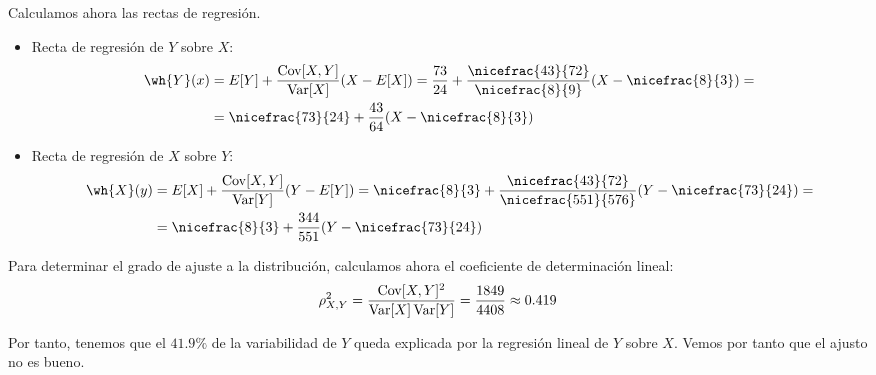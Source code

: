 \begin{ejercicio}
    Calculamos ahora las rectas de regresión.
    \begin{itemize}
        \item Recta de regresión de $Y$ sobre $X$:
        \begin{align*}
            \wh{Y}(x) &= E[Y] + \dfrac{\Cov[X,Y]}{\Var[X]}(X - E[X])
            = \frac{73}{24} + \dfrac{\nicefrac{43}{72}}{\nicefrac{8}{9}}(X - \nicefrac{8}{3})
            =\\&= \nicefrac{73}{24} + \dfrac{43}{64}(X - \nicefrac{8}{3})
        \end{align*}

        \item Recta de regresión de $X$ sobre $Y$:
        \begin{align*}
            \wh{X}(y) &= E[X] + \dfrac{\Cov[X,Y]}{\Var[Y]}(Y - E[Y])
            = \nicefrac{8}{3} + \dfrac{\nicefrac{43}{72}}{\nicefrac{551}{576}}(Y - \nicefrac{73}{24})
            =\\&= \nicefrac{8}{3} + \dfrac{344}{551}(Y - \nicefrac{73}{24})
        \end{align*}
    \end{itemize}

    Para determinar el grado de ajuste a la distribución, calculamos ahora el coeficiente de determinación lineal:
    \begin{equation*}
        \rho_{X,Y}^2 = \dfrac{\operatorname{Cov}[X,Y]^2}{\operatorname{Var}[X]\operatorname{Var}[Y]} = \dfrac{1849}{4408} \approx 0.419
    \end{equation*}

    Por tanto, tenemos que el $41.9\%$ de la variabilidad de $Y$ queda explicada por la regresión lineal de $Y$ sobre $X$.
    Vemos por tanto que el ajusto no es bueno.
\end{ejercicio}

